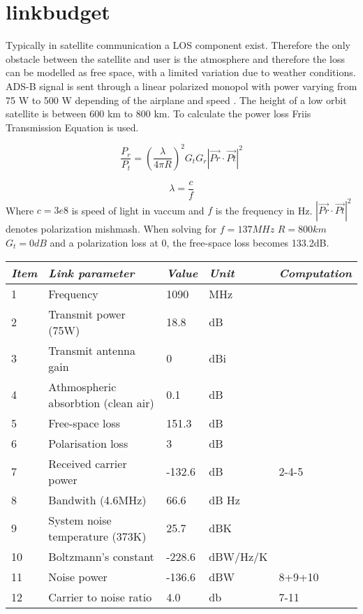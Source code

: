\chapter{linkbudget}\label{ch:linkbudget}

Typically in satellite communication a LOS component exist. Therefore the only obstacle between the satellite and user is the atmosphere and therefore the loss can be modelled as free space, with a limited variation due to weather conditions. ADS-B signal is sent through a linear polarized monopol with power varying from 75 W to 500 W depending of the airplane and speed \citep{FlyingLab}. The height of a low orbit satellite is between 600 km to 800 km. To calculate the power loss Friis Transmission Equation is used. 

\begin{equation}
\frac{P_r}{P_t} = (\frac{\lambda}{4\pi R})^2 G_t G_r|\vec{Pr}\cdot \vec{Pt}|^2
\end{equation}

\begin{equation}
\lambda = \frac{c}{f}
\end{equation}
Where $c = 3e8$ is speed of light in vaccum and $ f$ is the frequency in Hz. $|\vec{Pr}\cdot \vec{Pt}|^2$ denotes polarization mishmash. When solving for $f = 137MHz$ $R=800km$  $G_t = 0 dB$ and a polarization loss at 0, the free-space loss becomes 133.2dB.


\begin{center}
  \begin{tabular}{ l  l  l  l  l}
    \hline
   \textit{Item} & \textit{Link parameter} & \textit{Value} & \textit{Unit} & \textit{Computation} \\ \hline
    1 & Frequency	& 1090 & MHz & \\ \hline
    2 & Transmit power (75W) & 18.8 & dB & \\ \hline
    3 & Transmit antenna gain & 0 & dBi & \\ \hline
    4 & Athmospheric absorbtion (clean air) & 0.1 & dB & \\ \hline
    5 & Free-space loss & 151.3 & dB & \\ \hline
    6 & Polarisation loss & 3 & dB & \\ \hline
    7 & Received carrier power & -132.6 & dB & 2-4-5\\ \hline
    8 & Bandwith (4.6MHz) & 66.6 & dB Hz & \\ \hline 
    9 & System noise temperature (373K) & 25.7 & dBK& \\ \hline 
    10 & Boltzmann's constant & -228.6 & dBW/Hz/K& \\ \hline 
    11 & Noise power & -136.6 & dBW& 8+9+10\\ \hline 
    12 & Carrier to noise ratio & 4.0 & db & 7-11\\ \hline 
  \end{tabular}
\end{center}